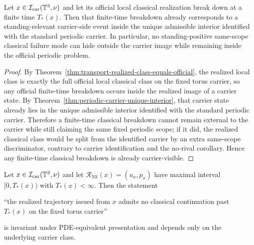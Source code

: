 \begin{manualcorollary}
\label{cor:breakdown-carrier-visible}
Let $x\in\mathcal I_{\mathrm{car}}(\mathbb{T}^3,\nu)$ and let its official local classical realization break down at a finite time $T_*(x)$. Then that finite-time breakdown already corresponds to a standing-relevant carrier-side event inside the unique admissible interior identified with the standard periodic carrier. In particular, no standing-positive same-scope classical failure mode can hide outside the carrier image while remaining inside the official periodic problem.
\end{manualcorollary}

\begin{proof}
By Theorem~\ref{thm:transport-realized-class-equals-official}, the realized local class is exactly the full official local classical class on the fixed torus carrier, so any official finite-time breakdown occurs inside the realized image of a carrier state. By Theorem~\ref{thm:periodic-carrier-unique-interior}, that carrier state already lies in the unique admissible interior identified with the standard periodic carrier. Therefore a finite-time classical breakdown cannot remain external to the carrier while still claiming the same fixed periodic scope; if it did, the realized classical class would be split from the identified carrier by an extra same-scope discriminator, contrary to carrier identification and the no-rival corollary. Hence any finite-time classical breakdown is already carrier-visible.
\end{proof}

\begin{proposition}\label{prop:finite-time-breakdown-discriminator}
Let $x\in\mathcal I_{\mathrm{car}}(\mathbb{T}^3,\nu)$ and let
$\mathcal R_{\mathrm{NS}}(x)=(u_x,p_x)$ have maximal interval $[0,T_*(x))$ with $T_*(x)<\infty$.
Then the statement

\centerline{``the realized trajectory issued from $x$ admits no classical continuation past $T_*(x)$ on the fixed torus carrier''}

is invariant under PDE-equivalent presentation and depends only on the underlying carrier class.
\end{proposition}

